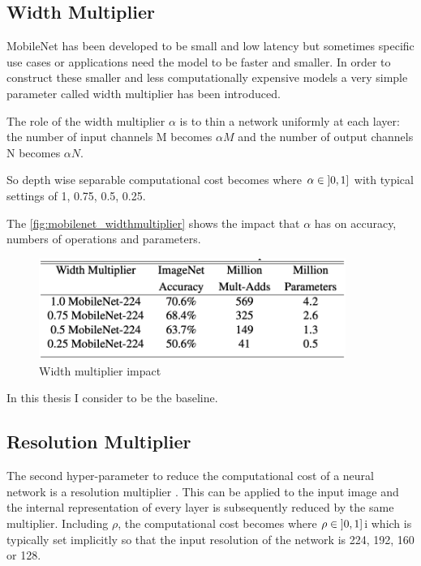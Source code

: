 \subsection{Width Multiplier}
MobileNet has been developed to be small and low latency but sometimes specific
use cases or applications need the model to be faster and smaller.
In order to construct these smaller and less computationally expensive models
a very simple parameter \bm{$\alpha$} called width multiplier has been
introduced.

The role of the width multiplier $\alpha$ is to thin a network uniformly at
each layer: the number of input channels M becomes $\alpha M$ and the number of
output channels N becomes $\alpha N$.

So depth wise separable computational cost becomes  where $\alpha \in \interval[open left]{0}{1}$ with typical settings of 1,
0.75, 0.5, 0.25.

The \autoref{fig:mobilenet_widthmultiplier} shows the impact that $\alpha$ has
on accuracy, numbers of operations and parameters.

\begin{figure}[ht]
    \includegraphics[width=10cm]{images/experiments/mobilenet_widthmultiplier.png}
    \centering
    \caption{Width multiplier impact}\label{fig:mobilenet_widthmultiplier}
\end{figure}

In this thesis I consider  to be the baseline.

\subsection{Resolution Multiplier}
The second hyper-parameter to reduce the computational cost of a neural network
is a resolution multiplier \bm{$\rho$}. This can be applied to the input image
and the internal representation of every layer is subsequently reduced by the
same multiplier.
Including $\rho$, the computational cost becomes  where $\rho \in \interval[open left]{0}{1}$i which is
typically set implicitly so that the input resolution of the network is 224,
192, 160 or 128.

